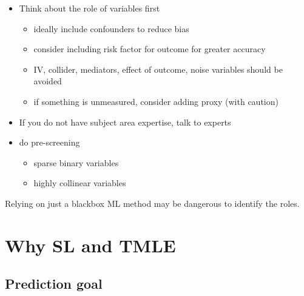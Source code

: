 \documentclass[
]{book}
\providecommand{\tightlist}{%
  \setlength{\itemsep}{0pt}\setlength{\parskip}{0pt}}
\begin{document}
\begin{itemize}
\tightlist
\item
  Think about the role of variables first

  \begin{itemize}
  \tightlist
  \item
    ideally include confounders to reduce bias
  \item
    consider including risk factor for outcome for greater accuracy
  \item
    IV, collider, mediators, effect of outcome, noise variables should be avoided
  \item
    if something is unmeasured, consider adding proxy (with caution)
  \end{itemize}
\item
  If you do not have subject area expertise, talk to experts
\item
  do pre-screening

  \begin{itemize}
  \tightlist
  \item
    sparse binary variables
  \item
    highly collinear variables
  \end{itemize}
\end{itemize}

Relying on just a blackbox ML method may be dangerous to identify the roles.

\hypertarget{why-sl-and-tmle}{%
\section{Why SL and TMLE}\label{why-sl-and-tmle}}

\hypertarget{prediction-goal}{%
\subsection{Prediction goal}\label{prediction-goal}}
\end{document}

